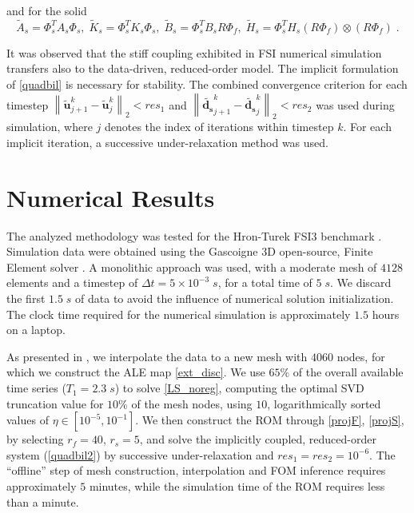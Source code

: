 \documentclass[%
  onecolumn
]{mpi2015-cscpreprint}
\begin{document}
\noindent and for the solid 
\begin{equation}
\label{projS}
\tilde{A}_s=\Phi_s^T A_s \Phi_s, \; \tilde{K}_s=\Phi_s^T K_s \Phi_s, \; 
\tilde{B}_s=\Phi_s^T B_s R \Phi_f, \; \tilde{H}_s=\Phi_s^T H_s (R \Phi_f) \otimes (R \Phi_f) \;.
\end{equation}

It was observed that the stiff coupling exhibited in FSI numerical simulation \cite{bench} transfers also to the data-driven, reduced-order model. The implicit formulation of \cref{quadbil} is necessary for stability. The combined convergence criterion for each timestep ${\left\| \tilde{\mathbf{u}}_{j+1}^k -\tilde{\mathbf{u}}_{j}^k\right\|}_2<res_1$ and ${\left\| \tilde{\mathbf{d_s}}_{j+1}^k -\tilde{\mathbf{d_s}}_{j}^k\right\|}_2<res_2$ was used during simulation, where $j$ denotes the index of iterations within timestep $k$. For each implicit iteration, a successive under-relaxation method was used.

\section{Numerical Results}

The analyzed methodology was tested for the Hron-Turek FSI3 benchmark \cite{bench}. Simulation data were obtained using the Gascoigne 3D open-source, Finite Element solver \cite{gas}. A monolithic approach was used, with a moderate mesh of $4128$ elements and a timestep of $\Delta t=5\times 10^{-3} \; s$, for a total time of $5 \; s$. We discard the first $1.5 \; s$ of data to avoid the influence of numerical solution initialization. The clock time required for the numerical simulation is approximately $1.5$ hours on a laptop.

As presented in , we interpolate the data to a new mesh with $4060$ nodes, for which we construct the ALE map \cref{ext_disc}. We use $65\%$ of the overall available time series ($T_1=2.3 \;s$) to solve \cref{LS_noreg}, computing the optimal SVD truncation value for $10 \% $ of the mesh nodes, using $10$, logarithmically sorted values of $\eta \in [10^{-5},10^{-1}]$. We then construct the ROM through \cref{projF}, \cref{projS}, by selecting $r_f=40$, $r_s=5$, and solve the implicitly coupled, reduced-order system (\ref{quadbil2}) by successive under-relaxation and $res_1=res_2=10^{-6}$. The ``offline'' step of mesh construction, interpolation and FOM inference requires approximately $5$ minutes, while the simulation time of the ROM requires less than a minute.
\end{document}
